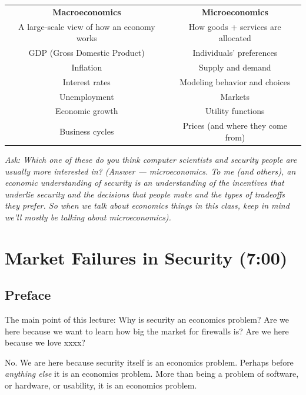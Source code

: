 \documentclass[11pt]{article}
\begin{document}
\begin{table}[H]
    \centering
    \begin{tabular}{c|c}
        \hline
        {\bf Macroeconomics} & {\bf Microeconomics} \\
        A large-scale view of how an economy works & How goods + services are allocated   \\ 
        \hline
        GDP (Gross Domestic Product) & Individuals' preferences \\
        Inflation & Supply and demand\\
        Interest rates & Modeling behavior and choices\\
        Unemployment & Markets \\ 
        Economic growth & Utility functions \\ 
        Business cycles & Prices (and where they come from)\\ 

        \hline
    \end{tabular}
\end{table}
        
{\it Ask: Which one of these do you think computer scientists and security people are usually more interested in? (Answer --- microeconomics. To me (and others), an economic understanding of security is an understanding of the incentives that underlie security and the decisions that people make and the types of tradeoffs they prefer. So when we talk about economics things in this class, keep in mind we'll mostly be talking about microeconomics).}




\section{Market Failures in Security (7:00)}


\subsection{Preface}

The main point of this lecture: Why is security an economics problem? Are we here because we want to learn how big the market for firewalls is? Are we here because we love xxxx?

No. We are here because security itself is an economics problem. Perhaps before \textit{anything else} it is an economics problem. More than being a problem of software, or hardware, or usability, it is an economics problem.
\end{document}
